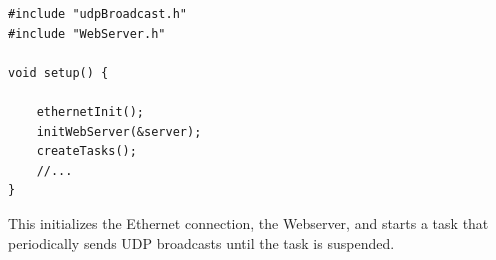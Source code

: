     \begin{verbatim}
#include "udpBroadcast.h"
#include "WebServer.h"

void setup() {

    ethernetInit();
    initWebServer(&server);
    createTasks();
    //...
}
    \end{verbatim}

    This initializes the Ethernet connection, the Webserver, and starts
    a task that periodically sends UDP broadcasts until the task is 
    suspended.
